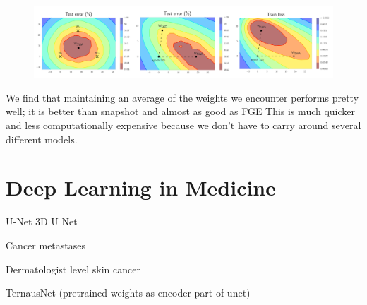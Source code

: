 \begin{figure}
    \centering
    \includegraphics[width=\textwidth]{./img/SWA.png}
    \caption{\cite{Izmailov_Podoprikhin_Garipov_Vetrov_Wilson_2018}}
    \label{fig:SWA}
\end{figure}


We find that maintaining an average of the weights we encounter performs pretty well; it is better than snapshot and almost as good as FGE
This is much quicker and less computationally expensive because we don't have to carry around several different models. \cite{Izmailov_Podoprikhin_Garipov_Vetrov_Wilson_2018}

\section{Deep Learning in Medicine}\label{deep_learning_medic_lit}
U-Net \cite{Ronneberger_Fischer_Brox_2015}
3D U Net \cite{Cicek_Abdulkadir_Lienkamp_Brox_Ronneberger_2016}

Cancer metastases \cite{Liu_Gadepalli_Norouzi_Dahl_Kohlberger_Boyko_Venugopalan_Timofeev_Nelson_Corrado_et_al_2017}

Dermatologist level skin cancer \cite{Esteva_Kuprel_Novoa_Ko_Swetter_Blau_Thrun_2017}

TernausNet (pretrained weights as encoder part of unet) \cite{Iglovikov_Shvets_2018}

